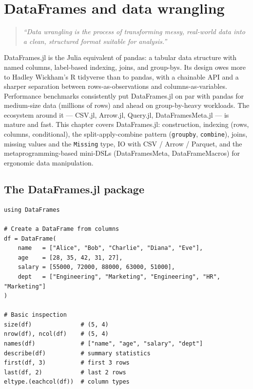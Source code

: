 \chapter{DataFrames and data wrangling}
\label{ch:dataframes}

\begin{quote}
\emph{``Data wrangling is the process of transforming messy, real-world data into a clean, structured format suitable for analysis.''}
\end{quote}

DataFrames.jl is the Julia equivalent of pandas: a tabular data structure with named columns, label-based indexing, joins, and group-bys. Its design owes more to Hadley Wickham's R tidyverse than to pandas, with a chainable API and a sharper separation between rows-as-observations and columns-as-variables. Performance benchmarks consistently put DataFrames.jl on par with pandas for medium-size data (millions of rows) and ahead on group-by-heavy workloads. The ecosystem around it --- CSV.jl, Arrow.jl, Query.jl, DataFramesMeta.jl --- is mature and fast. This chapter covers DataFrames.jl: construction, indexing (rows, columns, conditional), the split-apply-combine pattern (\texttt{groupby}, \texttt{combine}), joins, missing values and the \texttt{Missing} type, IO with CSV / Arrow / Parquet, and the metaprogramming-based mini-DSLs (DataFramesMeta, DataFrameMacros) for ergonomic data manipulation.

\section{The DataFrames.jl package}

\begin{verbatim}
using DataFrames

# Create a DataFrame from columns
df = DataFrame(
    name   = ["Alice", "Bob", "Charlie", "Diana", "Eve"],
    age    = [28, 35, 42, 31, 27],
    salary = [55000, 72000, 88000, 63000, 51000],
    dept   = ["Engineering", "Marketing", "Engineering", "HR", "Marketing"]
)

# Basic inspection
size(df)              # (5, 4)
nrow(df), ncol(df)    # (5, 4)
names(df)             # ["name", "age", "salary", "dept"]
describe(df)          # summary statistics
first(df, 3)          # first 3 rows
last(df, 2)           # last 2 rows
eltype.(eachcol(df))  # column types
\end{verbatim}

